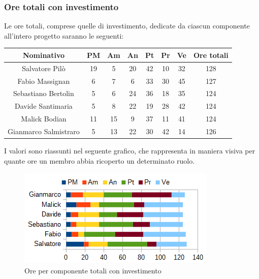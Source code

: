 		\subsubsection{Ore totali con investimento}
		Le ore totali, comprese quelle di investimento, dedicate da ciascun componente all'intero progetto saranno le seguenti: \\
		\begin{table}[H]
		\centering
		\begin{tabular}{|c|c|c|c|c|c|c|c|}
			\hline
			\textbf{Nominativo}		& \textbf{PM}	& \textbf{Am}	& \textbf{An}	& \textbf{Pt}	& \textbf{Pr}	& \textbf{Ve}	& \textbf{Ore totali}     \\
			\hline
			Salvatore Pilò			& 19	& 5		& 20	& 42	& 10	& 32	& 128 \\
			Fabio Massignan			& 6		& 7		& 6		& 33	& 30	& 45	& 127 \\
			Sebastiano Bertolin		& 5		& 6		& 24	& 36	& 18	& 35	& 124 \\
			Davide Santimaria		& 5		& 8		& 22	& 19	& 28	& 42	& 124 \\
			Malick Bodian			& 11	& 15	& 9		& 37	& 11	& 41	& 124 \\
			Gianmarco Salmistraro	& 5		& 13	& 22	& 30	& 42	& 14	& 126 \\
			\hline
		\end{tabular}
		\end{table}
		I valori sono riassunti nel seguente grafico, che rappresenta in maniera visiva per quante ore un membro abbia ricoperto un determinato ruolo. \\
		\begin{figure}[H]
			\centering
			\includegraphics[scale=1]{immagini/grafici/riepilogo_conclusivo-barra.png}
			\caption{Ore per componente totali con investimento}
		\end{figure}
